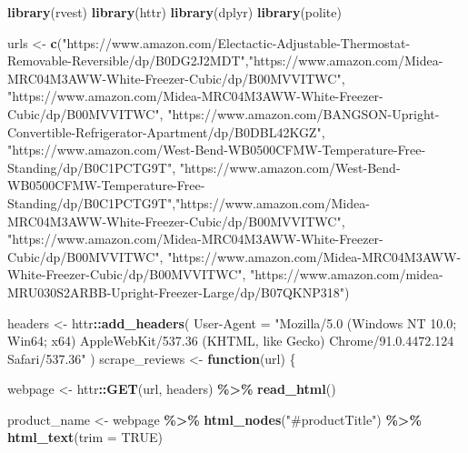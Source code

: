 \documentclass[
  11pt,
]{article}
\newenvironment{Shaded}{\begin{snugshade}}{\end{snugshade}}
\newcommand{\AttributeTok}[1]{\textcolor[rgb]{0.13,0.29,0.53}{#1}}
\newcommand{\ConstantTok}[1]{\textcolor[rgb]{0.56,0.35,0.01}{#1}}
\newcommand{\ControlFlowTok}[1]{\textcolor[rgb]{0.13,0.29,0.53}{\textbf{#1}}}
\newcommand{\FunctionTok}[1]{\textcolor[rgb]{0.13,0.29,0.53}{\textbf{#1}}}
\newcommand{\NormalTok}[1]{#1}
\newcommand{\OtherTok}[1]{\textcolor[rgb]{0.56,0.35,0.01}{#1}}
\newcommand{\SpecialCharTok}[1]{\textcolor[rgb]{0.81,0.36,0.00}{\textbf{#1}}}
\newcommand{\StringTok}[1]{\textcolor[rgb]{0.31,0.60,0.02}{#1}}
\begin{document}
\begin{Shaded}
\begin{Highlighting}[]
\FunctionTok{library}\NormalTok{(rvest)}
\FunctionTok{library}\NormalTok{(httr)}
\FunctionTok{library}\NormalTok{(dplyr)}
\FunctionTok{library}\NormalTok{(polite)}

\NormalTok{urls }\OtherTok{\textless{}{-}} \FunctionTok{c}\NormalTok{(}\StringTok{"https://www.amazon.com/Electactic{-}Adjustable{-}Thermostat{-}Removable{-}Reversible/dp/B0DG2J2MDT"}\NormalTok{,}\StringTok{"https://www.amazon.com/Midea{-}MRC04M3AWW{-}White{-}Freezer{-}Cubic/dp/B00MVVITWC"}\NormalTok{,}
          \StringTok{"https://www.amazon.com/Midea{-}MRC04M3AWW{-}White{-}Freezer{-}Cubic/dp/B00MVVITWC"}\NormalTok{, }
          \StringTok{"https://www.amazon.com/BANGSON{-}Upright{-}Convertible{-}Refrigerator{-}Apartment/dp/B0DBL42KGZ"}\NormalTok{,}
          \StringTok{"https://www.amazon.com/West{-}Bend{-}WB0500CFMW{-}Temperature{-}Free{-}Standing/dp/B0C1PCTG9T"}\NormalTok{, }\StringTok{"https://www.amazon.com/West{-}Bend{-}WB0500CFMW{-}Temperature{-}Free{-}Standing/dp/B0C1PCTG9T"}\NormalTok{,}\StringTok{"https://www.amazon.com/Midea{-}MRC04M3AWW{-}White{-}Freezer{-}Cubic/dp/B00MVVITWC"}\NormalTok{, }\StringTok{"https://www.amazon.com/Midea{-}MRC04M3AWW{-}White{-}Freezer{-}Cubic/dp/B00MVVITWC"}\NormalTok{, }\StringTok{"https://www.amazon.com/Midea{-}MRC04M3AWW{-}White{-}Freezer{-}Cubic/dp/B00MVVITWC"}\NormalTok{, }\StringTok{"https://www.amazon.com/midea{-}MRU030S2ARBB{-}Upright{-}Freezer{-}Large/dp/B07QKNP318"}\NormalTok{)}

\NormalTok{headers }\OtherTok{\textless{}{-}}\NormalTok{ httr}\SpecialCharTok{::}\FunctionTok{add\_headers}\NormalTok{(}
  \StringTok{\textasciigrave{}}\AttributeTok{User{-}Agent}\StringTok{\textasciigrave{}} \OtherTok{=} \StringTok{"Mozilla/5.0 (Windows NT 10.0; Win64; x64) AppleWebKit/537.36 (KHTML, like Gecko) Chrome/91.0.4472.124 Safari/537.36"}
\NormalTok{)}
\NormalTok{scrape\_reviews }\OtherTok{\textless{}{-}} \ControlFlowTok{function}\NormalTok{(url) \{}
  
\NormalTok{  webpage }\OtherTok{\textless{}{-}}\NormalTok{ httr}\SpecialCharTok{::}\FunctionTok{GET}\NormalTok{(url, headers) }\SpecialCharTok{\%\textgreater{}\%} \FunctionTok{read\_html}\NormalTok{()}

  
\NormalTok{  product\_name }\OtherTok{\textless{}{-}}\NormalTok{ webpage }\SpecialCharTok{\%\textgreater{}\%}
    \FunctionTok{html\_nodes}\NormalTok{(}\StringTok{"\#productTitle"}\NormalTok{) }\SpecialCharTok{\%\textgreater{}\%}
    \FunctionTok{html\_text}\NormalTok{(}\AttributeTok{trim =} \ConstantTok{TRUE}\NormalTok{)}
  

\end{Highlighting}
\end{Shaded}
\end{document}

